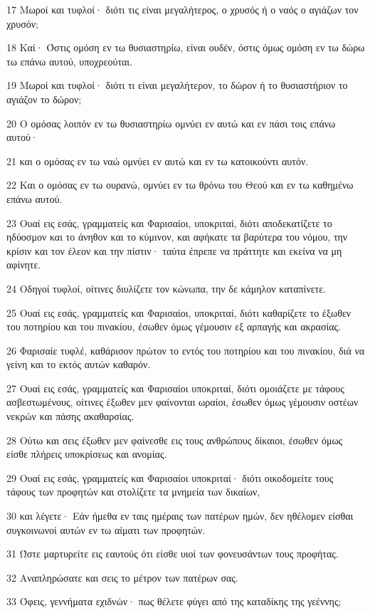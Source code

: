 \par 17 Μωροί και τυφλοί· διότι τις είναι μεγαλήτερος, ο χρυσός ή ο ναός ο αγιάζων τον χρυσόν;
\par 18 Καί· Όστις ομόση εν τω θυσιαστηρίω, είναι ουδέν, όστις όμως ομόση εν τω δώρω τω επάνω αυτού, υποχρεούται.
\par 19 Μωροί και τυφλοί· διότι τι είναι μεγαλήτερον, το δώρον ή το θυσιαστήριον το αγιάζον το δώρον;
\par 20 Ο ομόσας λοιπόν εν τω θυσιαστηρίω ομνύει εν αυτώ και εν πάσι τοις επάνω αυτού·
\par 21 και ο ομόσας εν τω ναώ ομνύει εν αυτώ και εν τω κατοικούντι αυτόν.
\par 22 Και ο ομόσας εν τω ουρανώ, ομνύει εν τω θρόνω του Θεού και εν τω καθημένω επάνω αυτού.
\par 23 Ουαί εις εσάς, γραμματείς και Φαρισαίοι, υποκριταί, διότι αποδεκατίζετε το ηδύοσμον και το άνηθον και το κύμινον, και αφήκατε τα βαρύτερα του νόμου, την κρίσιν και τον έλεον και την πίστιν· ταύτα έπρεπε να πράττητε και εκείνα να μη αφίνητε.
\par 24 Οδηγοί τυφλοί, οίτινες διυλίζετε τον κώνωπα, την δε κάμηλον καταπίνετε.
\par 25 Ουαί εις εσάς, γραμματείς και Φαρισαίοι, υποκριταί, διότι καθαρίζετε το έξωθεν του ποτηρίου και του πινακίου, έσωθεν όμως γέμουσιν εξ αρπαγής και ακρασίας.
\par 26 Φαρισαίε τυφλέ, καθάρισον πρώτον το εντός του ποτηρίου και του πινακίου, διά να γείνη και το εκτός αυτών καθαρόν.
\par 27 Ουαί εις εσάς, γραμματείς και Φαρισαίοι υποκριταί, διότι ομοιάζετε με τάφους ασβεστωμένους, οίτινες έξωθεν μεν φαίνονται ωραίοι, έσωθεν όμως γέμουσιν οστέων νεκρών και πάσης ακαθαρσίας.
\par 28 Ούτω και σεις έξωθεν μεν φαίνεσθε εις τους ανθρώπους δίκαιοι, έσωθεν όμως είσθε πλήρεις υποκρίσεως και ανομίας.
\par 29 Ουαί εις εσάς, γραμματείς και Φαρισαίοι υποκριταί· διότι οικοδομείτε τους τάφους των προφητών και στολίζετε τα μνημεία των δικαίων,
\par 30 και λέγετε· Εάν ήμεθα εν ταις ημέραις των πατέρων ημών, δεν ηθέλομεν είσθαι συγκοινωνοί αυτών εν τω αίματι των προφητών.
\par 31 Ώστε μαρτυρείτε εις εαυτούς ότι είσθε υιοί των φονευσάντων τους προφήτας.
\par 32 Αναπληρώσατε και σεις το μέτρον των πατέρων σας.
\par 33 Όφεις, γεννήματα εχιδνών· πως θέλετε φύγει από της καταδίκης της γεέννης;

